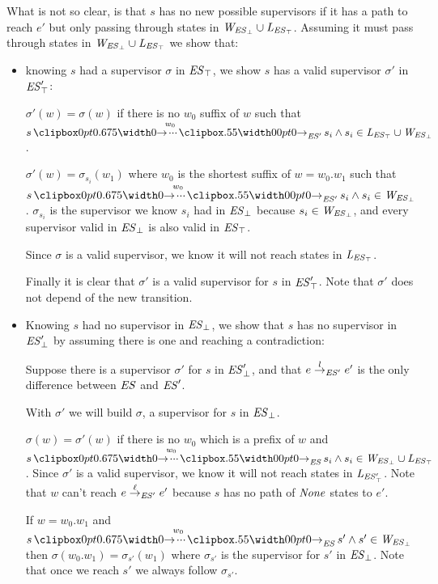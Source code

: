 What is not so clear, is that $s$ has no new possible supervisors if it has a path to reach $e'$ but only passing through states in $\mathit{W_{\mathit{\mathit{ES}_{\bot}}}} \cup \mathit{L_{\mathit{\mathit{ES}_{\top}}}}$. Assuming it must pass through states in $\mathit{W_{\mathit{\mathit{ES}_{\bot}}}} \cup \mathit{L_{\mathit{\mathit{ES}_{\top}}}}$ we show that:

\begin{itemize}
	\item knowing $s$ had a supervisor $\sigma$ in $\mathit{\mathit{ES}_{\top}}$, we show $s$ has a valid supervisor $\sigma'$ in $\mathit{\mathit{ES}'_{\top}}$:
	
	$\sigma'(w) = \sigma(w)$ if there is no $w_0$ suffix of $w$ such that $ s \runw{w_0}{\structure'} s_i \wedge s_i \in \LES \cup \WES$. 
	
	$\sigma'(w) = \sigma_{s_i}(w_1)$ where $w_0$ is the shortest suffix of $w = w_0.w_1$ such that $ s \runw{w_0}{\structure'} s_i \wedge s_i \in \WES$. $\sigma_{s_i}$ is the supervisor we know $s_i$ had in $\mathit{\mathit{ES}_{\bot}}$ because $s_i \in \mathit{W_{\mathit{\mathit{ES}_{\bot}}}}$, and every supervisor valid in $\mathit{\mathit{ES}_{\bot}}$ is also valid in $\mathit{\mathit{ES}_{\top}}$.
	
	Since $\sigma$ is a valid supervisor, we know it will not reach states in $\mathit{L_{\mathit{\mathit{ES}_{\top}}}}$.
	
	Finally it is clear that $\sigma'$ is a valid supervisor for $s$ in $\mathit{\mathit{ES}'_{\top}}$. Note that $\sigma'$ does not depend of the new transition.
	
	
	
	
	\item Knowing $s$ had no supervisor in $\mathit{\mathit{ES}_{\bot}}$, we show that $s$ has no supervisor in $\mathit{\mathit{ES}'_{\bot}}$ by assuming there is one and reaching a contradiction:
	
	Suppose there is a supervisor $\sigma'$ for $s$ in $\mathit{\mathit{ES}'_{\bot}}$, and that $e \overset{l}{\rightarrow}_{\mathit{ES}'} e'$ is the only difference between $\mathit{ES}$ and $\mathit{ES}'$.
	
	With $\sigma'$ we will build $\sigma$, a supervisor for $s$ in $\mathit{\mathit{ES}_{\bot}}$.
	
	$\sigma(w) = \sigma'(w)$ if there is no $w_0$ which is a prefix of $w$ and $s \runw{w_0}{\structure} s_i \wedge s_i \in \WES \cup \LES$. Since $\sigma'$ is a valid supervisor, we know it will not reach states in $\mathit{L_{\mathit{\mathit{ES}'_{\top}}}}$. Note that $w$ can't reach $e \overset{\ell}{\rightarrow}_{\mathit{ES}'} e'$ because $s$ has no path of $\mathit{None}$ states to $e'$.
	
	If $w=w_0.w_1$ and $s \runw{w_0}{\structure} s' \wedge s' \in \WES$ then $\sigma(w_0.w_1) = \sigma_{s'}(w_1)$ where $\sigma_{s'}$ is the supervisor for $s'$ in $\mathit{\mathit{ES}_{\bot}}$. Note that once we reach $s'$ we always follow $\sigma_{s'}$.
	

\end{itemize}
